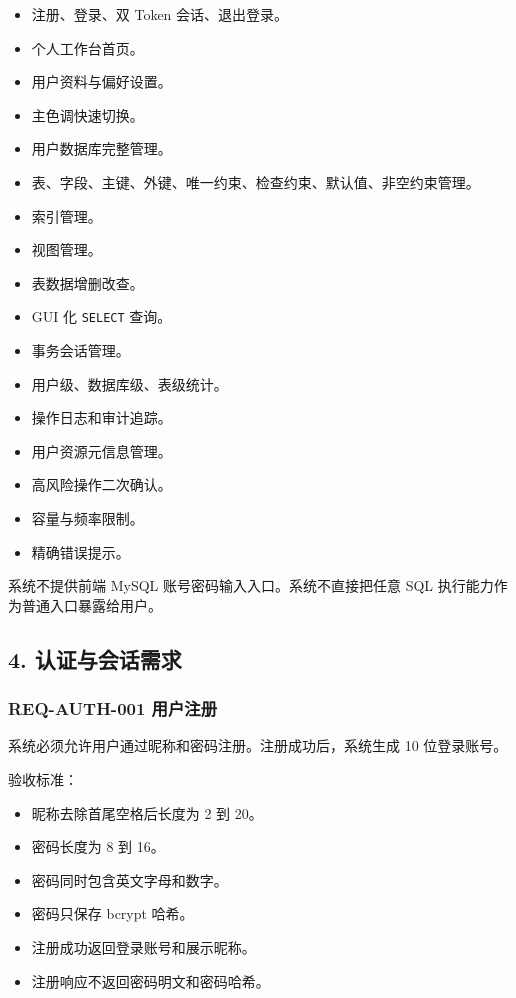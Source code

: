 \documentclass[
  a4paper,
  UTF8]{ctexart}
\providecommand{\tightlist}{%
  \setlength{\itemsep}{0pt}\setlength{\parskip}{0pt}}
\begin{document}
\begin{itemize}
\tightlist
\item
  注册、登录、双 Token 会话、退出登录。
\item
  个人工作台首页。
\item
  用户资料与偏好设置。
\item
  主色调快速切换。
\item
  用户数据库完整管理。
\item
  表、字段、主键、外键、唯一约束、检查约束、默认值、非空约束管理。
\item
  索引管理。
\item
  视图管理。
\item
  表数据增删改查。
\item
  GUI 化 \texttt{SELECT} 查询。
\item
  事务会话管理。
\item
  用户级、数据库级、表级统计。
\item
  操作日志和审计追踪。
\item
  用户资源元信息管理。
\item
  高风险操作二次确认。
\item
  容量与频率限制。
\item
  精确错误提示。
\end{itemize}

系统不提供前端 MySQL 账号密码输入入口。系统不直接把任意 SQL
执行能力作为普通入口暴露给用户。

\hypertarget{ux8ba4ux8bc1ux4e0eux4f1aux8bddux9700ux6c42}{%
\subsection{4.
认证与会话需求}\label{ux8ba4ux8bc1ux4e0eux4f1aux8bddux9700ux6c42}}

\hypertarget{req-auth-001-ux7528ux6237ux6ce8ux518c}{%
\subsubsection{REQ-AUTH-001
用户注册}\label{req-auth-001-ux7528ux6237ux6ce8ux518c}}

系统必须允许用户通过昵称和密码注册。注册成功后，系统生成 10 位登录账号。

验收标准：

\begin{itemize}
\tightlist
\item
  昵称去除首尾空格后长度为 2 到 20。
\item
  密码长度为 8 到 16。
\item
  密码同时包含英文字母和数字。
\item
  密码只保存 bcrypt 哈希。
\item
  注册成功返回登录账号和展示昵称。
\item
  注册响应不返回密码明文和密码哈希。
\end{itemize}
\end{document}
